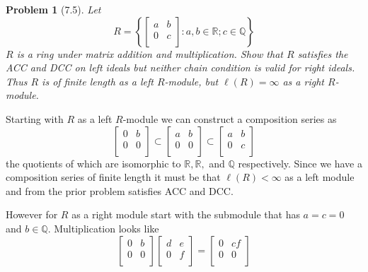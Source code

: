 \documentclass[10pt]{article}
\newcommand{\sk}{\vskip 10mm}
\newcommand{\bb}[1]{\mathbb{#1}}
\theoremstyle{plain}
\newtheorem{problem}{Problem}
\theoremstyle{remark}
\begin{document}
\sk

\begin{problem}[7.5]
  Let
  \[
    R=
    \left\{
      \left[
        \begin{array}{cc}
          a&b\\
          0&c\\
        \end{array}
      \right]
      :
      a,b\in\bb{R}; c\in\bb{Q}
    \right\}
  \]
  $R$ is a ring under matrix addition and multiplication. Show that $R$
  satisfies the ACC and DCC on left ideals but neither chain condition
  is valid for right ideals. Thus $R$ is of finite length as a left
  $R$-module, but $\ell(R)=\infty$ as a right $R$-module.
\end{problem}

Starting with $R$ as a left $R$-module we can construct a composition
series as
\[
  \left[
    \begin{array}{cc}
      0&b\\
      0&0\\
    \end{array}
  \right]
  \subset
  \left[
    \begin{array}{cc}
      a&b\\
      0&0\\
    \end{array}
  \right]
  \subset
  \left[
    \begin{array}{cc}
      a&b\\
      0&c\\
    \end{array}
  \right]
\]
the quotients of which are isomorphic to $\bb{R},\bb{R},$ and $\bb{Q}$
respectively. Since we have a composition series of finite length
it must be that $\ell(R)<\infty$ as a left module and from the prior problem
satisfies ACC and DCC.

However for $R$ as a right module start with the submodule that
has $a=c=0$ and $b\in \bb{Q}$. Multiplication looks like
\[
  \left[
    \begin{array}{cc}
      0&b\\
      0&0\\
    \end{array}
  \right]
  \left[
    \begin{array}{cc}
      d&e\\
      0&f\\
    \end{array}
  \right]
  =
  \left[
    \begin{array}{cc}
      0&cf\\
      0&0\\
    \end{array}
  \right]
\]
\end{document}

